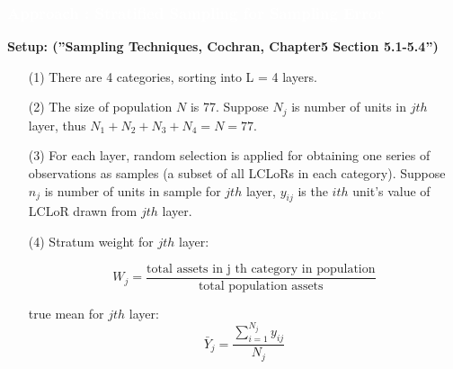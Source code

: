 \documentclass{beamer}	%
\theoremstyle{plain}
\theoremstyle{definition}
\theoremstyle{remark}
\numberwithin{equation}{section}
\begin{document}
\begin{frame}
\frametitle{\textcolor{white}{Approach \uppercase\expandafter{} : Stratified Sampling for Sampling Error}}
\small

\textbf{Setup: (''Sampling Techniques, Cochran, Chapter5 Section 5.1-5.4'')}
\begin{itemize}
	\scriptsize
	\item[(1)]There are 4 categories, sorting into L = 4 layers.
	\item[(2)]The size of population $N$ is 77. Suppose $N_{j}$ is number of units in $j th$ layer, thus $N_{1} + N_{2} + N_{3} + N_{4} = N = 77.$ 
	\item[(3)]For each layer, random selection is applied for obtaining one series of observations as samples (a subset of all LCLoRs in each category). Suppose $n_{j}$ is number of units in sample for $j th$ layer, $y_{ij}$ is the $ith$ unit's value of LCLoR drawn from $j th$ layer.
	\item[(4)]Stratum weight for $j th$ layer:  
	
	\begin{equation}
	W_{j} = \frac{\text{total assets in j th category in population}}{\text{total population assets}}
	\end{equation}
	
	true mean for $j th$ layer:
	\begin{equation}
	\bar{Y}_{j}=\frac{\sum_{i=1}^{N_{j}} y_{i j}}{N_{j}}
	\end{equation}
	
\end{itemize}

\end{frame}
\end{document}
